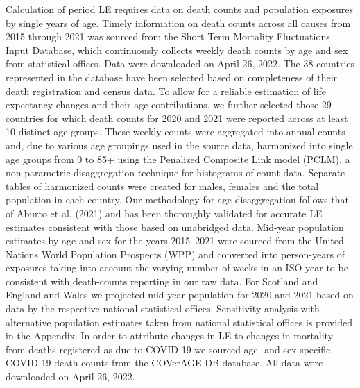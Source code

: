 \documentclass[12pt]{article}
\begin{document}
Calculation of period LE requires data on death counts and population exposures by single years of age. Timely information on death counts across all causes from 2015 through 2021 was sourced from the Short Term Mortality Fluctuations Input Database,\cite{Jdanov2021, Nemeth2021} which continuously collects weekly death counts by age and sex from statistical offices. Data were downloaded on April 26, 2022. The 38 countries represented in the database have been selected based on completeness of their death registration and census data. To allow for a reliable estimation of life expectancy changes and their age contributions, we further selected those 29 countries for which death counts for 2020 and 2021 were reported across at least 10 distinct age groups. These weekly counts were aggregated into annual counts and, due to various age groupings used in the source data, harmonized into single age groups from 0 to 85+ using the Penalized Composite Link model (PCLM),\cite{Rizzi2015, Pascariu2018} a non-parametric disaggregation technique for histograms of count data. Separate tables of harmonized counts were created for males, females and the total population in each country. Our methodology for age disaggregation follows that of Aburto et al. (2021)\cite{Aburto2021b} and has been thoroughly validated for accurate LE estimates consistent with those based on unabridged data. Mid-year population estimates by age and sex for the years 2015--2021 were sourced from the United Nations World Population Prospects (WPP)\cite{UnitedNations2021} and converted into person-years of exposures taking into account the varying number of weeks in an ISO-year \cite{IOS2021} to be consistent with death-counts reporting in our raw data. For Scotland and England and Wales we projected mid-year population for 2020 and 2021 based on data by the respective national statistical offices. Sensitivity analysis with alternative population estimates taken from national statistical offices is provided in the Appendix. In order to attribute changes in LE to changes in mortality from deaths registered as due to COVID-19 we sourced age- and sex-specific COVID-19 death counts from the COVerAGE-DB database.\cite{Riffe2021} All data were downloaded on April 26, 2022.
\end{document}
